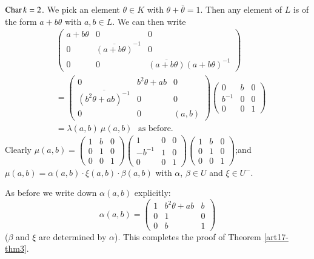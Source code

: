 \begin{case}%
$\operatorname{Char} k =2$. We pick an element $\theta \in K$ with $\theta + \bar{\theta} =1$. Then any element of $L$ is of the form $a + b \theta$ with $a, b \in L$. We can then write
\begin{align*}
& \left(\begin{matrix}
a +b \theta & 0 & 0\\
0 & \overline{(a+b \theta)}^{-1} & 0\\
0 & 0 &\overline{(a + b \theta)} (a + b \theta)^{-1}
\end{matrix}\right)\\
& =  \left(\begin{matrix}
0 & b^2 \theta + a b & 0\\
\overline{(b^2 \theta + a b)^{-1}} & 0 & 0 \\
0 & 0 & (a,b)
\end{matrix}\right)
\left(\begin{matrix}
0 & b & 0 \\
b^{-1} & 0 & 0 \\
0 & 0 & 1
\end{matrix}\right)\\
& = \lambda (a,b) ~ \mu(a,b) \text{~ as before.}
\end{align*}
Clearly $\mu(a,b) = \left(\begin{matrix}
1 & b & 0\\
0 & 1 & 0\\
0 & 0 & 1
\end{matrix}\right) \left(\begin{matrix}
1 & 0 & 0 \\
-b^{-1} & 1 & 0\\
0 & 0 & 1
\end{matrix}\right) \left( \begin{matrix}
1 & b & 0\\
0 & 1 & 0\\
0 & 0 & 1
\end{matrix}\right)$;\quad and\hfill\break  $\mu (a,b) = \alpha (a,b) \cdot \xi (a,b) \cdot \beta (a,b)$ with $\alpha$, $\beta \in U$ and $\xi \in U^-$.

As before we write down $\alpha (a,b)$ explicitly:
$$
\alpha (a,b) = \left(\begin{matrix}
1 & b^2 \theta + ab & b  \\
0 & 1 & 0\\
0 & b & 1
\end{matrix}\right)
$$
($\beta$ and $\xi$ are determined by $\alpha$). This completes the proof of Theorem \ref{art17-thm3}.
\end{case}

